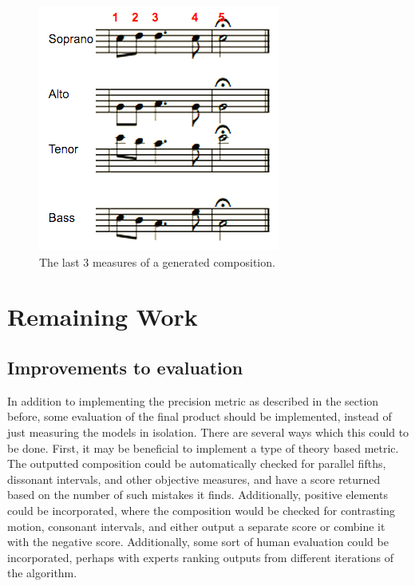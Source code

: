 \documentclass{sig-alternate}
\begin{document}
\begin{figure}
  \includegraphics[scale=0.8]{measures.png}
  \caption{The last 3 measures of a generated composition.}
\end{figure}



\section{Remaining Work}
\subsection{Improvements to evaluation}
In addition to implementing the precision metric as described in the section before, some evaluation of the final product should be implemented, instead of just measuring the models in isolation. There are several ways which this could to be done. First, it may be beneficial to implement a type of theory based metric. The outputted composition could be automatically checked for parallel fifths, dissonant intervals, and other objective measures, and have a score returned based on the number of such mistakes it finds. Additionally, positive elements could be incorporated, where the composition would be checked for contrasting motion, consonant intervals, and either output a separate score or combine it with the negative score. Additionally, some sort of human evaluation could be incorporated, perhaps with experts ranking outputs from different iterations of the algorithm.
\end{document}
